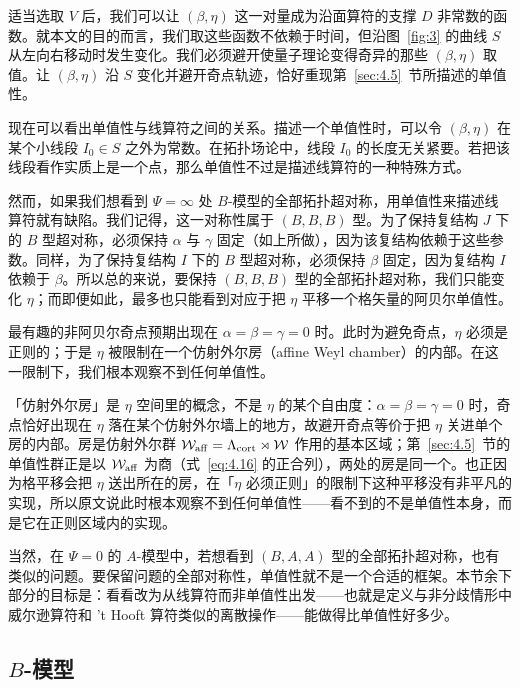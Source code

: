 适当选取 $V$ 后，我们可以让 $(\beta,\eta)$ 这一对量成为沿面算符的支撑 $D$ 非常数的函数。就本文的目的而言，我们取这些函数不依赖于时间，但沿图~\ref{fig:3} 的曲线 $S$ 从左向右移动时发生变化。我们必须避开使量子理论变得奇异的那些 $(\beta,\eta)$ 取值。让 $(\beta,\eta)$ 沿 $S$ 变化并避开奇点轨迹，恰好重现第~\ref{sec:4.5}~节所描述的单值性。

现在可以看出单值性与线算符之间的关系。描述一个单值性时，可以令 $(\beta,\eta)$ 在某个小线段 $I_0\in S$ 之外为常数。在拓扑场论中，线段 $I_0$ 的长度无关紧要。若把该线段看作实质上是一个点，那么单值性不过是描述线算符的一种特殊方式。

然而，如果我们想看到 $\Psi=\infty$ 处 $B$-模型的全部拓扑超对称，用单值性来描述线算符就有缺陷。我们记得，这一对称性属于 $(B,B,B)$ 型。为了保持复结构 $J$ 下的 $B$ 型超对称，必须保持 $\alpha$ 与 $\gamma$ 固定（如上所做），因为该复结构依赖于这些参数。同样，为了保持复结构 $I$ 下的 $B$ 型超对称，必须保持 $\beta$ 固定，因为复结构 $I$ 依赖于 $\beta$。所以总的来说，要保持 $(B,B,B)$ 型的全部拓扑超对称，我们只能变化 $\eta$；而即便如此，最多也只能看到对应于把 $\eta$ 平移一个格矢量的阿贝尔单值性。

最有趣的非阿贝尔奇点预期出现在 $\alpha=\beta=\gamma=0$ 时。此时为避免奇点，$\eta$ 必须是正则的；于是 $\eta$ 被限制在一个仿射外尔房（affine Weyl chamber）的内部。在这一限制下，我们根本观察不到任何单值性。

\begin{yizhu}[易错点]
「仿射外尔房」是 $\eta$ 空间里的概念，不是 $\eta$ 的某个自由度：$\alpha=\beta=\gamma=0$ 时，奇点恰好出现在 $\eta$ 落在某个仿射外尔墙上的地方，故避开奇点等价于把 $\eta$ 关进单个房的内部。房是仿射外尔群 ${\mathcal W}_{\rm aff}=\Lambda_{{\rm cort}}\rtimes{\mathcal W}$ 作用的基本区域；第~\ref{sec:4.5}~节的单值性群正是以 ${\mathcal W}_{\rm aff}$ 为商（式~\eqref{eq:4.16} 的正合列），两处的房是同一个。也正因为格平移会把 $\eta$ 送出所在的房，在「$\eta$ 必须正则」的限制下这种平移没有非平凡的实现，所以原文说此时根本观察不到任何单值性——看不到的不是单值性本身，而是它在正则区域内的实现。
\end{yizhu}

当然，在 $\Psi=0$ 的 $A$-模型中，若想看到 $(B,A,A)$ 型的全部拓扑超对称，也有类似的问题。要保留问题的全部对称性，单值性就不是一个合适的框架。本节余下部分的目标是：看看改为从线算符而非单值性出发——也就是定义与非分歧情形中威尔逊算符和 't Hooft 算符类似的离散操作——能做得比单值性好多少。

\subsection{\texorpdfstring{$B$-模型}{B-模型}}

